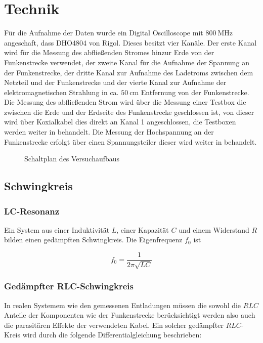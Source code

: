 \section{Technik}
\label{sec:technic}
Für die Aufnahme der Daten wurde ein Digital Oscilloscope mit \(\SI{800}{\mega\hertz}\) angeschaft, dass DHO4804 von Rigol. Dieses besitzt vier Kanäle. Der erste Kanal wird für die Messung des abfließenden Stromes hinzur Erde von der Funkenstrecke verwendet, der zweite Kanal für die Aufnahme der Spannung an der Funkenstrecke, der dritte Kanal zur Aufnahme des Ladetroms zwischen dem Netzteil und der Funkenstrecke und der vierte Kanal zur Aufnahme der elektromagnetischen Strahlung in ca. \(\SI{50}{\centi\meter}\) Entfernung von der Funkenstrecke. Die Messung des abfließenden Strom wird über die Messung einer Testbox die zwischen die Erde und der Erdseite des Funkenstrecke geschlossen ist, von dieser wird über Koxialkabel dies direkt an Kanal 1 angeschlossen, die Testboxen werden weiter in  behandelt. Die Messung der Hochspannung an der Funkenstrecke erfolgt über einen Spannungsteiler dieser wird weiter in  behandelt.

\begin{figure}[H]
    \centering
    
    \caption{Schaltplan des Versuchaufbaus}
    \label{fig:setup_circuit}
\end{figure}


\subsection{Schwingkreis}

\subsubsection{LC-Resonanz}
Ein System aus einer Induktivität \(L\), einer Kapazität \(C\) und einem Widerstand \(R\) bilden einen gedämpften Schwingkreis. Die Eigenfrequenz \(f_0\) ist

\begin{equation}
f_0 = \frac{1}{2\pi \sqrt{LC}}
\end{equation}

\subsubsection{Gedämpfter RLC-Schwingkreis}
In realen Systemem wie den gemessenen Entladungen müssen die sowohl die \(RLC\) Anteile der Komponenten wie der Funkenstrecke berücksichtigt werden also auch die parasitären Effekte der verwendeten Kabel. Ein solcher gedämpfter \(RLC\)-Kreis wird durch die folgende Differentialgleichung beschrieben:

